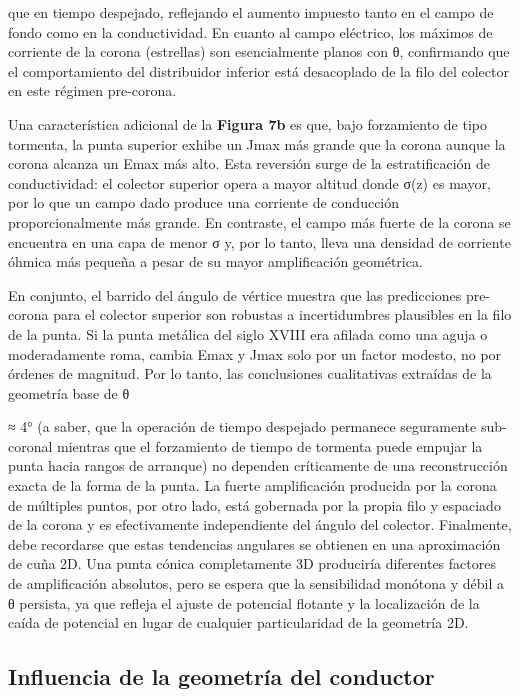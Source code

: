 \documentclass[
]{article}
\begin{document}
que en tiempo despejado, reflejando el aumento impuesto tanto en el
campo de fondo como en la conductividad. En cuanto al campo eléctrico,
los máximos de corriente de la corona (estrellas) son esencialmente
planos con θ, confirmando que el comportamiento del distribuidor
inferior está desacoplado de la filo del colector en este régimen
pre-corona.

Una característica adicional de la \textbf{Figura 7b} es que, bajo
forzamiento de tipo tormenta, la punta superior exhibe un Jmax más
grande que la corona aunque la corona alcanza un Emax más alto. Esta
reversión surge de la estratificación de conductividad: el colector
superior opera a mayor altitud donde σ(z) es mayor, por lo que un campo
dado produce una corriente de conducción proporcionalmente más grande.
En contraste, el campo más fuerte de la corona se encuentra en una capa
de menor σ y, por lo tanto, lleva una densidad de corriente óhmica más
pequeña a pesar de su mayor amplificación geométrica.

En conjunto, el barrido del ángulo de vértice muestra que las
predicciones pre-corona para el colector superior son robustas a
incertidumbres plausibles en la filo de la punta. Si la punta metálica
del siglo XVIII era afilada como una aguja o moderadamente roma, cambia
Emax y Jmax solo por un factor modesto, no por órdenes de magnitud. Por
lo tanto, las conclusiones cualitativas extraídas de la geometría base
de θ

≈ 4° (a saber, que la operación de tiempo despejado permanece
seguramente sub-coronal mientras que el forzamiento de tiempo de
tormenta puede empujar la punta hacia rangos de arranque) no dependen
críticamente de una reconstrucción exacta de la forma de la punta. La
fuerte amplificación producida por la corona de múltiples puntos, por
otro lado, está gobernada por la propia filo y espaciado de la corona y
es efectivamente independiente del ángulo del colector. Finalmente, debe
recordarse que estas tendencias angulares se obtienen en una
aproximación de cuña 2D. Una punta cónica completamente 3D produciría
diferentes factores de amplificación absolutos, pero se espera que la
sensibilidad monótona y débil a θ persista, ya que refleja el ajuste de
potencial flotante y la localización de la caída de potencial en lugar
de cualquier particularidad de la geometría 2D.

\subsection{Influencia de la geometría del
conductor}\label{influencia-de-la-geometruxeda-del-conductor}
\end{document}
